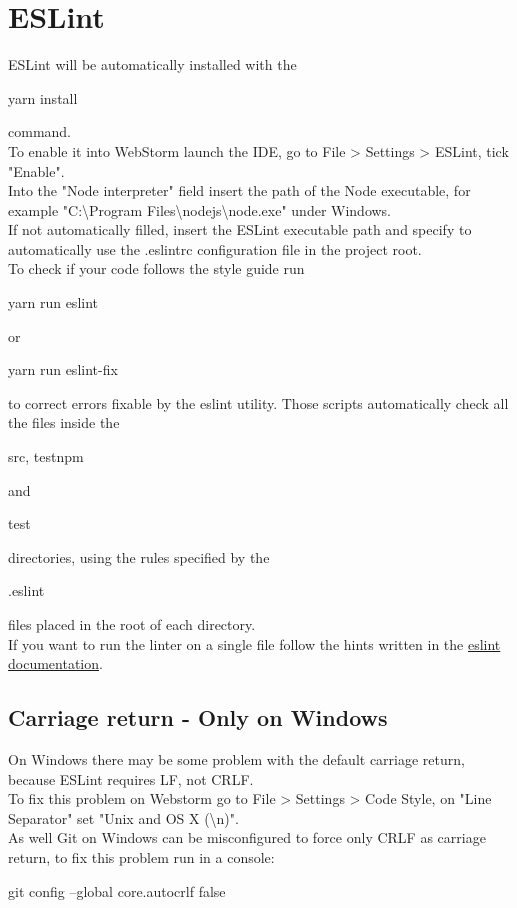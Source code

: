\documentclass[ManualeSviluppatore.tex]{subfiles}
\begin{document}
\section{ESLint}
ESLint will be automatically installed with the \begin{ttfamily}yarn install \end{ttfamily}command. \\
To enable it into WebStorm launch the IDE, go to File \textgreater{} Settings \textgreater{} ESLint, tick "Enable". \\
Into the "Node interpreter" field insert the path of the Node executable, for example "C:\textbackslash Program Files\textbackslash nodejs\textbackslash node.exe" under Windows. \\
If not automatically filled, insert the ESLint executable path and specify to automatically use the .eslintrc configuration file in the project root.\\
To check if your code follows the style guide run \begin{ttfamily}yarn run eslint\end{ttfamily} or \begin{ttfamily} yarn run eslint-fix\end{ttfamily} to correct errors fixable by the eslint utility.
Those scripts automatically check all the files inside the \begin{ttfamily}src, testnpm\end{ttfamily} and \begin{ttfamily}test\end{ttfamily} directories, using the rules specified by the \begin{ttfamily}.eslint\end{ttfamily} files placed in the root of each directory.\\
If you want to run the linter on a single file follow the hints written in the \href{https://eslint.org/docs/user-guide/getting-started}{eslint documentation}.

\subsection{Carriage return - Only on Windows}
On Windows there may be some problem with the default carriage return, because ESLint requires LF, not CRLF. \\
To fix this problem on Webstorm go to File \textgreater{} Settings \textgreater{} Code Style, on "Line Separator" set "Unix and OS X (\textbackslash{}n)". \\
As well Git on Windows can be misconfigured to force only CRLF as carriage return, to fix this problem run in a console: \\
\begin{ttfamily}git config --global core.autocrlf false \end{ttfamily}
\end{document}
